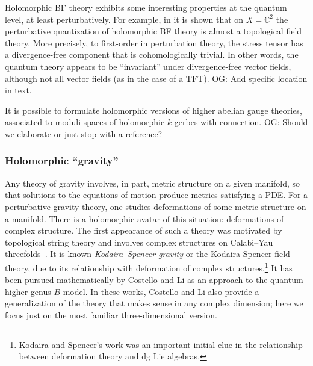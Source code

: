 \documentclass[11pt]{amsart}
\def\C{{\mathbb{C}}}
\def\owen#1{{\textcolor{violet!50!black}{OG: {#1}}}}
\begin{document}
\begin{rmk}
Holomorphic BF theory exhibits some interesting properties at the quantum level,
at least perturbatively.
For example, in \cite{semichiral} it is shown that on $X = \C^2$ 
the perturbative quantization of holomorphic BF theory is almost a topological field theory. 
More precisely, to first-order in perturbation theory, 
the stress tensor has a divergence-free component that is cohomologically trivial. 
In other words, the quantum theory appears to be ``invariant'' under divergence-free vector fields,
although not all vector fields (as in the case of a TFT).
\owen{Add specific location in text.}
\end{rmk}

It is possible to formulate holomorphic versions of higher abelian gauge theories,
associated to moduli spaces of holomorphic $k$-gerbes with connection.
\owen{Should we elaborate or just stop with a reference?}

\subsubsection{Holomorphic ``gravity''}

Any theory of gravity involves, in part, metric structure on a given manifold,
so that solutions to the equations of motion produce metrics satisfying a PDE. 
For a perturbative gravity theory,
one studies deformations of some metric structure on a manifold.
There is a holomorphic avatar of this situation: deformations of complex structure. 
The first appearance of such a theory was motivated by topological string theory and involves complex structures on Calabi--Yau threefolds~\cite{BCOV}.
It is known \textit{Kodaira--Spencer gravity} or the Kodaira-Spencer field theory,
due to its relationship with deformation of complex structures.\footnote{Kodaira and Spencer's work was an important initial clue in the relationship between deformation theory and dg Lie algebras.}
It has been pursued mathematically by Costello and Li \cite{CLbcov1,CLbcov2,LiThesis} as an approach to the quantum higher genus $B$-model.
In these works, Costello and Li also provide a generalization of the theory that makes sense in any complex dimension; 
here we focus just on the most familiar three-dimensional version.
\end{document}
